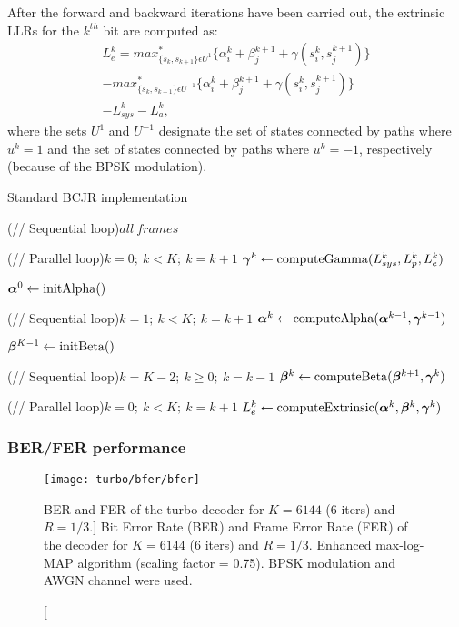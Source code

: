 After the forward and backward iterations have been carried out, the extrinsic
LLRs for the $k^{th}$ bit are computed as:
\begin{equation}
  \label{eq:turbo_ext}
  \begin{aligned}
  L_e^k = max_{\{s_k, s_{k+1}\}\epsilon U^1}^*\{ \alpha_i^k + \beta_j^{k+1} +
  \gamma(s_i^k, s_j^{k+1}) \} \\
  - max_{\{s_k, s_{k+1}\}\epsilon U^{-1}}^*\{ \alpha_i^k + \beta_j^{k+1} +
  \gamma(s_i^k, s_j^{k+1}) \} \\
  - L_{sys}^k - L_a^k,
  \end{aligned}
\end{equation}
where the sets $U^1$ and $U^{-1}$ designate the set of states connected by paths
where $u^k=1$ and the set of states connected by paths where $u^k=-1$,
respectively (because of the BPSK modulation).

\begin{algorithm}
  \caption{Standard BCJR implementation}
  \label{alg:turbo_bcjr}

  \For(// Sequential loop){$all~frames$}
  {
    \For(// Parallel loop){$k=0;~k<K;~k=k+1$}
    {
      $\boldsymbol{\gamma}^k\gets \operatorname*{computeGamma}(L_{sys}^k, L_{p}^k, L_{e}^k)$
    }

    $\boldsymbol{\alpha}^0\gets \operatorname*{initAlpha}()$

    \For(// Sequential loop){$k=1;~k<K;~k=k+1$}
    {
      $\boldsymbol{\alpha}^k\gets \operatorname*{computeAlpha}(\boldsymbol{\alpha}^{k-1}, \boldsymbol{\gamma}^{k-1})$
    }

    $\boldsymbol{\beta}^{K-1}\gets \operatorname*{initBeta}()$

    \For(// Sequential loop){$k=K-2;~k \geq 0;~k=k-1$}
    {
      $\boldsymbol{\beta}^k\gets \operatorname*{computeBeta}(\boldsymbol{\beta}^{k+1}, \boldsymbol{\gamma}^{k})$
    }

    \For(// Parallel loop){$k=0;~k<K;~k=k+1$}
    {
      $L_e^k\gets \operatorname*{computeExtrinsic}(\boldsymbol{\alpha}^k, \boldsymbol{\beta}^{k}, \boldsymbol{\gamma}^{k})$
    }
  }
\end{algorithm}

\subsubsection{BER/FER performance}

\begin{figure}[htp]
  \centering
  \texttt{[image: turbo/bfer/bfer]}
  \caption
    [BER and FER of the turbo decoder for $K = 6144$ (6 iters) and $R=1/3$.]
    {Bit Error Rate (BER) and Frame Error Rate (FER) of the decoder for $K =
    6144$ (6 iters) and $R=1/3$. Enhanced max-log-MAP algorithm (scaling
    factor = 0.75). BPSK modulation and AWGN channel were used.}
  \label{plot:turbo_bfer}
\end{figure}

